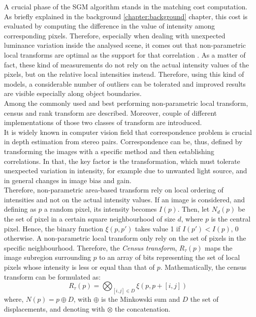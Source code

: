 A crucial phase of the SGM algorithm stands in the matching cost computation.
As briefly explained in the background \ref{chapter:background} chapter, this cost is evaluated by computing the difference in the value of intensity among corresponding pixels.
Therefore, especially when dealing with unexpected luminance variation inside the analysed scene, it comes out that non-parametric local transforms are optimal as the support for that correlation \cite{Zabih1994}.
As a matter of fact, these kind of measurements do not rely on the actual intensity values of the pixels, but on the relative local intensities instead.
Therefore, using this kind of models, a considerable number of outliers can be tolerated and improved results are visible especially along object boundaries.\\
Among the commonly used and best performing non-parametric local transform, census and rank transform are described.
Moreover, couple of different implementations of those two classes of transform are introduced.\\
It is widely known in computer vision field that correspondence problem is crucial in depth estimation from stereo pairs.
Correspondence can be, thus, defined by transforming the images with a specific method and then establishing correlations.
In that, the key factor is the transformation, which must tolerate unexpected variation in intensity, for example due to unwanted light source, and in general changes in image bias and gain.\\
Therefore, non-parametric area-based transform rely on local ordering of intensities and not on the actual intensity values.
If an image is considered, and defining as $p$ a random pixel, its intensity becomes $I(p)$. 
Then, let $N_d(p)$ be the set of pixel in a certain square neighbourhood of size $d$, where $p$ is the central pixel. 
Hence, the binary function $\xi(p, p')$ takes value 1 if $I(p') < I(p)$, 0 otherwise.
A non-parametric local transform only rely on the set of pixels in the specific neighbourhood.
Therefore, the \textit{Census transform}, $R_{\tau}(p)$ maps the image subregion surrounding $p$ to an array of bits representing the set of local pixels whose intensity is less or equal than that of $p$. 
Mathematically, the census transform can be formulated as:
\begin{equation}
	\label{eqn:census-transform}
	R_{\tau}(p) = \bigotimes_{[i, j] \in D} \xi(p, p +[i, j])
\end{equation}
where, $N(p) = p \oplus D$, with $\oplus$ is the Minkowski sum and $D$ the set of displacements, and denoting with $\otimes$ the concatenation. 
